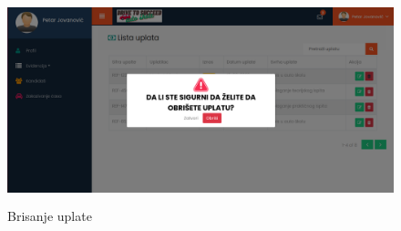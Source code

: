 \begin{figure}[H]
  \begin{center}
      \includegraphics[width=140mm, height=60mm]{UI/UI_brisanje_uplate.png}
  \end{center}
  \caption {Brisanje uplate}
  \label{fig:ui_brisanje}

\end{figure}

